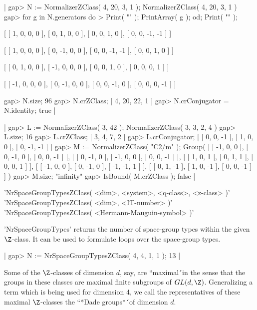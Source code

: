 |    gap> N := NormalizerZClass( 4, 20, 3, 1 );
    NormalizerZClass( 4, 20, 3, 1 )
    gap> for g in N.generators do
    >  Print( "\n" ); PrintArray( g ); od; Print( "\n" );

    [ [   1,   0,   0,   0 ],
      [   0,   1,   0,   0 ],
      [   0,   0,   1,   0 ],
      [   0,   0,  -1,  -1 ] ]

    [ [   1,   0,   0,   0 ],
      [   0,  -1,   0,   0 ],
      [   0,   0,  -1,  -1 ],
      [   0,   0,   1,   0 ] ]

    [ [   0,   1,   0,   0 ],
      [  -1,   0,   0,   0 ],
      [   0,   0,   1,   0 ],
      [   0,   0,   0,   1 ] ]

    [ [  -1,   0,   0,   0 ],
      [   0,  -1,   0,   0 ],
      [   0,   0,  -1,   0 ],
      [   0,   0,   0,  -1 ] ]

    gap> N.size;
    96
    gap> N.crZClass;
    [ 4, 20, 22, 1 ]
    gap> N.crConjugator = N.identity;
    true |

|    gap> L := NormalizerZClass( 3, 42 );
    NormalizerZClass( 3, 3, 2, 4 )
    gap> L.size;
    16
    gap> L.crZClass;
    [ 3, 4, 7, 2 ]
    gap> L.crConjugator;
    [ [ 0, 0, -1 ], [ 1, 0, 0 ], [ 0, -1, -1 ] ]
    gap> M := NormalizerZClass( "C2/m" );
    Group( [ [ -1, 0, 0 ], [ 0, -1, 0 ], [ 0, 0, -1 ] ],
    [ [ 0, -1, 0 ], [ -1, 0, 0 ], [ 0, 0, -1 ] ],
    [ [ 1, 0, 1 ], [ 0, 1, 1 ], [ 0, 0, 1 ] ],
    [ [ -1, 0, 0 ], [ 0, -1, 0 ], [ -1, -1, 1 ] ],
    [ [ 0, 1, -1 ], [ 1, 0, -1 ], [ 0, 0, -1 ] ] )
    gap> M.size;
    "infinity"
    gap> IsBound( M.crZClass );
    false |

'NrSpaceGroupTypesZClass( <dim>, <system>, <q-class>, <z-class> )'%
 \\
'NrSpaceGroupTypesZClass( <dim>, <IT-number> )' \\
'NrSpaceGroupTypesZClass( <Hermann-Mauguin-symbol> )'

'NrSpaceGroupTypes'  returns the number  of  space-group types within the
given $\Z$-class.  It can be used to formulate loops over the space-group
types.

|    gap> N := NrSpaceGroupTypesZClass( 4, 4, 1, 1 );
    13 |

\vspace{5mm}
Some of the $\Z$-classes  of   dimension $d$, say, are ``maximal\'\'\  in
the sense  that the groups in these  classes are maximal finite subgroups
of $GL(d,\Z)$.  Generalizing a term which is  being used for dimension 4,
we call the representatives   of these  maximal $\Z$-classes  the ``*Dade
groups*\'\'\ of dimension $d$.

